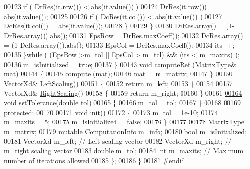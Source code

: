 \begin{DoxyCode}
00123             \textcolor{keywordflow}{if} ( DrRes(it.row()) < abs(it.value()) )
00124               DrRes(it.row()) = abs(it.value());
00125             
00126             \textcolor{keywordflow}{if} ( DcRes(it.col()) < abs(it.value()) )
00127               DcRes(it.col()) = abs(it.value());
00128           \}
00129         \}  
00130         DrRes.array() = (1-DrRes.array()).abs();
00131         EpsRow = DrRes.maxCoeff();
00132         DcRes.array() = (1-DcRes.array()).abs();
00133         EpsCol = DcRes.maxCoeff();
00134         its++;
00135       \}\textcolor{keywordflow}{while} ( (EpsRow >m\_tol || EpsCol > m\_tol) && (its < m\_maxits) );
00136       m\_isInitialized = \textcolor{keyword}{true};
00137     \}
\hyperlink{class_eigen_1_1_iter_scaling_aeff5ccef2ccb32c6f472a190f8a511af}{00143}     \textcolor{keywordtype}{void} \hyperlink{class_eigen_1_1_iter_scaling_aeff5ccef2ccb32c6f472a190f8a511af}{computeRef} (MatrixType& mat)
00144     \{
00145       \hyperlink{class_eigen_1_1_iter_scaling_a6a76754399fd004b3ac6011e272ffb71}{compute} (mat);
00146       mat = m\_matrix;
00147     \}
\hyperlink{class_eigen_1_1_iter_scaling_ab88d288be912d90a1e597e5dab0bd47b}{00150}     VectorXd& \hyperlink{class_eigen_1_1_iter_scaling_ab88d288be912d90a1e597e5dab0bd47b}{LeftScaling}()
00151     \{
00152       \textcolor{keywordflow}{return} m\_left;
00153     \}
00154     
\hyperlink{class_eigen_1_1_iter_scaling_a617229454935a6a4fda76b8af56c52ea}{00157}     VectorXd& \hyperlink{class_eigen_1_1_iter_scaling_a617229454935a6a4fda76b8af56c52ea}{RightScaling}()
00158     \{
00159       \textcolor{keywordflow}{return} m\_right;
00160     \}
00161     
\hyperlink{class_eigen_1_1_iter_scaling_acbca5170d8043f40e387bcb6a42f8b71}{00164}     \textcolor{keywordtype}{void} \hyperlink{class_eigen_1_1_iter_scaling_acbca5170d8043f40e387bcb6a42f8b71}{setTolerance}(\textcolor{keywordtype}{double} tol)
00165     \{
00166       m\_tol = tol; 
00167     \}
00168       
00169   \textcolor{keyword}{protected}:
00170     
00171     \textcolor{keywordtype}{void} \hyperlink{structinit}{init}()
00172     \{
00173       m\_tol = 1e-10;
00174       m\_maxits = 5;
00175       m\_isInitialized = \textcolor{keyword}{false};
00176     \}
00177     
00178     MatrixType m\_matrix;
00179     \textcolor{keyword}{mutable} \hyperlink{group__enums_ga85fad7b87587764e5cf6b513a9e0ee5e}{ComputationInfo} m\_info; 
00180     \textcolor{keywordtype}{bool} m\_isInitialized; 
00181     VectorXd m\_left; \textcolor{comment}{// Left scaling vector}
00182     VectorXd m\_right; \textcolor{comment}{// m\_right scaling vector}
00183     \textcolor{keywordtype}{double} m\_tol; 
00184     \textcolor{keywordtype}{int} m\_maxits; \textcolor{comment}{// Maximum number of iterations allowed}
00185 \};
00186 \}
00187 \textcolor{preprocessor}{#endif}
\end{DoxyCode}
